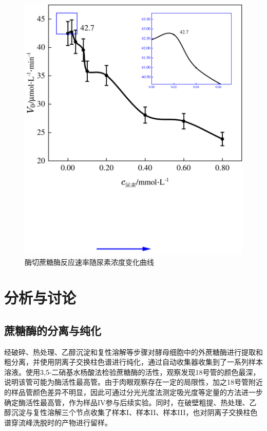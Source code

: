 \begin{figure}[H]
\begin{minipage}[t]{0.49\textwidth}
        \includegraphics[width = \textwidth]{figure/1215/Urea-EnzymeCut.pdf}
        \caption{酶切蔗糖酶反应速率随尿素浓度变化曲线}
        \label{fig:Urea-EnzymeCut}
    \end{minipage}
\end{figure}

\section{分析与讨论}

\subsection{蔗糖酶的分离与纯化}
经破碎、热处理、乙醇沉淀和复性溶解等步骤对酵母细胞中的外蔗糖酶进行提取和粗分离，并使用阴离子交换柱色谱进行纯化，通过自动收集器收集到了一系列样本溶液。使用3,5-二硝基水杨酸法检验蔗糖酶的活性，观察发现18号管的颜色最深，说明该管可能为酶活性最高管。由于肉眼观察存在一定的局限性，加之18号管附近的样品管颜色差异不明显，因此可通过分光光度法测定吸光度等定量的方法进一步确定酶活性最高管，作为样品IV参与后续实验。同时，在破壁粗提、热处理、乙醇沉淀与复性溶解三个节点收集了样本I、样本II、样本III，也对阴离子交换柱色谱穿流峰洗脱时的产物进行留样。

